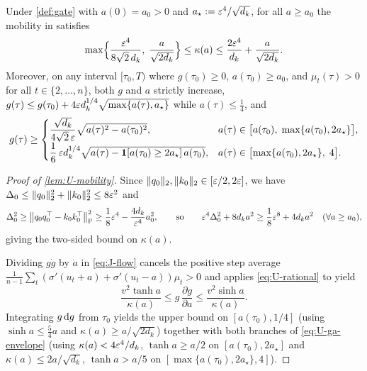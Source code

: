\begin{lemma}
\label{lem:U-mobility}
Under \cref{def:gate} with $a(0) = a_0 > 0$ and $a_\star := \varepsilon^4/\sqrt{d_k}$, for all $a \ge a_0$ the mobility in \stepode{} satisfies
\[
 \max\Bigl\{\frac{\varepsilon^4}{8\sqrt 2\,d_k},\; \frac{a}{\sqrt{2d_k}}\Bigr\} \le \kappa(a) \le \frac{2\varepsilon^4}{d_k} + \frac{a}{\sqrt{2d_k}}.
\]
Moreover, on any interval $[\tau_0, T)$ where $g(\tau_0) \ge 0$, $a(\tau_0) \ge a_0$, and $\mu_t(\tau) > 0$ for all $t \in \{2,\ldots,n\}$, both $g$ and $a$ strictly increase, $g(\tau) \le g(\tau_0) + 4\varepsilon d_k^{1/4}\sqrt{\max\{a(\tau), a_\star\}}$ while $a(\tau) \le \frac{1}{4}$, and
\begin{equation}
 g(\tau) \ge \begin{cases}
 \dfrac{\sqrt{d_k}}{4\sqrt 2\,\varepsilon}\sqrt{a(\tau)^2 - a(\tau_0)^2}, & a(\tau) \in \bigl[a(\tau_0),\; \max\{a(\tau_0), 2a_\star\}\bigr],\\[6pt]
 \dfrac{1}{6}\,\varepsilon d_k^{1/4}\sqrt{a(\tau) - \mathbf 1[a(\tau_0) \ge 2a_\star]\,a(\tau_0)}, & a(\tau) \in \bigl[\max\{a(\tau_0), 2a_\star\},\; 4\bigr].
 \end{cases}
 \label{eq:U-ga-envelope}
\end{equation}
\end{lemma}
\begin{proof}[Proof of \cref{lem:U-mobility}]
Since $\|q_0\|_2, \|k_0\|_2 \in [\varepsilon/2, 2\varepsilon]$, we have $\Delta_0 \le \|q_0\|_2^2 + \|k_0\|_2^2 \le 8\varepsilon^2$ and
\[
  \Delta_0^2 \ge \bigl\|q_0 q_0^\top - k_0 k_0^\top\bigr\|_{\mathrm{F}}^2 \ge \frac{1}{8}\varepsilon^4 - \frac{4d_k}{\varepsilon^4}a_0^2,
  \qquad\text{so}\qquad
  \varepsilon^4\Delta_0^2 + 8d_k a^2 \ge \frac{1}{8}\varepsilon^8 + 4d_k a^2 \quad (\forall a \ge a_0),
\]
giving the two-sided bound on $\kappa(a)$.

Dividing $g\dot g$ by $\dot a$ in \cref{eq:J-flow} cancels the positive step average $\frac{1}{n-1}\sum_t(\sigma'(u_t+a)+\sigma'(u_t-a))\mu_t > 0$ and applies \cref{eq:U-rational} to yield
\[
  \frac{v^2\tanh a}{\kappa(a)} \le g\,\frac{\partial g}{\partial a} \le \frac{v^2\sinh a}{\kappa(a)}.
\]
Integrating $g\,\mathrm{d} g$ from $\tau_0$ yields the upper bound on $[a(\tau_0), 1/4]$ (using $\sinh a \le \frac{5}{4}a$ and $\kappa(a) \ge a/\sqrt{2d_k}$) together with both branches of \cref{eq:U-ga-envelope} (using $\kappa(a) < 4\varepsilon^4/d_k$, $\tanh a \ge a/2$ on $[a(\tau_0), 2a_\star]$ and $\kappa(a) \le 2a/\sqrt{d_k}$, $\tanh a > a/5$ on $[\max\{a(\tau_0), 2a_\star\}, 4]$).
\end{proof}


